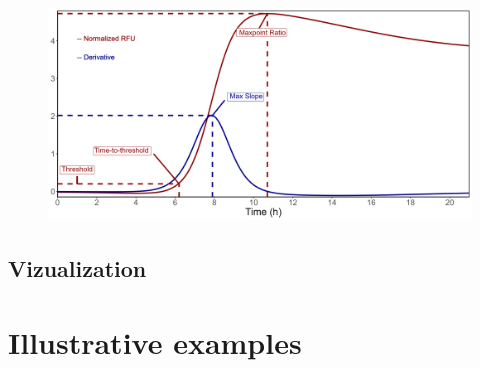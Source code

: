 \documentclass[preprint,12pt, a4paper]{elsarticle}
\begin{document}
        \begin{figure}[h]
            \caption{}
            \centering{}
            \includegraphics[width=\textwidth]{images/metric_example.png}
            \label{fig:metrics}
        \end{figure}

    \subsection{Vizualization}
        
    
\section{Illustrative examples}


\end{document}
